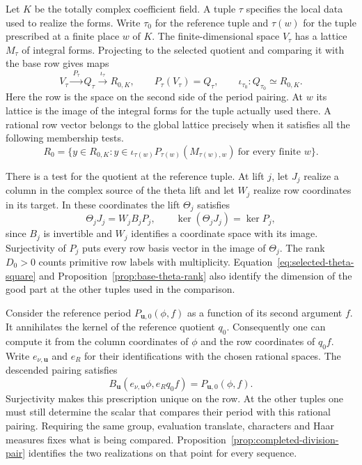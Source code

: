Let \(K\) be the totally complex coefficient field. A tuple \(\tau\) specifies the local data used to realize the forms. Write \(\tau_0\) for the reference tuple and \(\tau(w)\) for the tuple prescribed at a finite place \(w\) of \(K\). The finite-dimensional space \(V_{\tau}\) has a lattice \(M_{\tau}\) of integral forms. Projecting to the selected quotient and comparing it with the base row gives maps
\[
 V_{\tau}\xrightarrow{\ P_{\tau}\ }Q_{\tau}\xrightarrow{\ \iota_{\tau}\ }R_{0,K},
 \qquad P_{\tau}(V_{\tau})=Q_{\tau},\qquad \iota_{\tau_0}:Q_{\tau_0}\simeq R_{0,K}.
\]
Here the row is the space on the second side of the period pairing. At \(w\) its lattice is the image of the integral forms for the tuple actually used there. A rational row vector belongs to the global lattice precisely when it satisfies all the following membership tests.
\[
 R_0=\{y\in R_{0,K}: y\in\iota_{\tau(w)}P_{\tau(w)}(M_{\tau(w),w})
                           \ \text{for every finite }w\}.
\]

There is a test for the quotient at the reference tuple. At lift \(j\), let \(J_j\) realize a column in the complex source of the theta lift and let \(W_j\) realize row coordinates in its target. In these coordinates the lift \(\Theta_j\) satisfies
\[
                 \Theta_jJ_j=W_j B_jP_j,\qquad
                 \ker(\Theta_jJ_j)=\ker P_j,
\]
since \(B_j\) is invertible and \(W_j\) identifies a coordinate space with its image. Surjectivity of \(P_j\) puts every row basis vector in the image of \(\Theta_j\). The rank \(D_0>0\) counts primitive row labels with multiplicity. Equation~\eqref{eq:selected-theta-square} and Proposition~\ref{prop:base-theta-rank} also identify the dimension of the good part at the other tuples used in the comparison.

Consider the reference period \(P_{\mathbf u,0}(\phi,f)\) as a function of its second argument \(f\). It annihilates the kernel of the reference quotient \(q_0\). Consequently one can compute it from the column coordinates of \(\phi\) and the row coordinates of \(q_0 f\). Write \(e_{\nu,\mathbf u}\) and \(e_R\) for their identifications with the chosen rational spaces. The descended pairing satisfies
\[
              B_{\mathbf u}(e_{\nu,\mathbf u}\phi,e_R q_0 f)=P_{\mathbf u,0}(\phi,f).
\]
Surjectivity makes this prescription unique on the row. At the other tuples one must still determine the scalar that compares their period with this rational pairing. Requiring the same group, evaluation translate, characters and Haar measures fixes what is being compared. Proposition~\ref{prop:completed-division-pair} identifies the two realizations on that point for every sequence.

